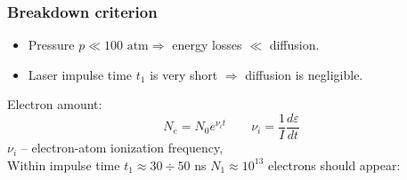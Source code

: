 \documentclass{beamer}
\begin{document}
	\begin{frame}
		\frametitle{Breakdown criterion}
		\begin{itemize}
			\item Pressure $p \ll 100 \text{ atm} \Rightarrow$ energy losses $\ll$ diffusion.
			\item Laser impulse time $t_1$ is very short $\Rightarrow$ diffusion is negligible.
			
		\end{itemize}
		
		
		Electron amount:
		$$ N_e = N_0 e^{\nu_i t} \qquad \nu_i = \frac{1}{I} \frac{d\varepsilon}{dt}$$
		$\nu_i$ -- electron-atom ionization frequency,\\
		
		Within impulse time $t_1 \approx 30 \div 50$ ns $N_1 \approx 10^{13}$ electrons should appear:
		
		\begin{center}
		\end{center}

	\end{frame}
\end{document}
